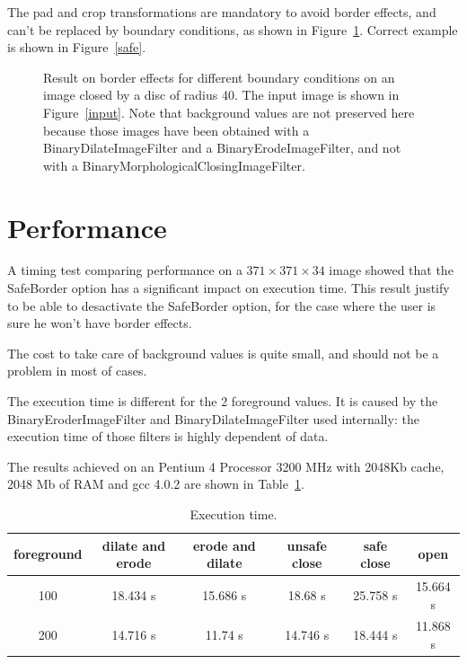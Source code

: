 \documentclass{InsightArticle}
\begin{document}
The pad and crop transformations are mandatory to avoid border effects, and can't
be replaced by boundary conditions, as shown in Figure~\ref{boundary}.
Correct example is shown in Figure~\ref{safe}.

\begin{figure}[htbp]
\begin{center}
\caption{Result on border effects for different boundary conditions on an image
closed by a disc of radius 40. The input image is shown in Figure~\ref{input}.
Note that 
background values are not preserved here because those images have been obtained
with a BinaryDilateImageFilter and a BinaryErodeImageFilter, and not with a
BinaryMorphologicalClosingImageFilter.\label{boundary}}
\end{center}
\end{figure}


\section{Performance}
A timing test comparing performance on a $371 \times 371 \times 34$
image showed that the SafeBorder option has a significant impact on execution
time. This result justify to be able to desactivate the SafeBorder
option, for the case where the user is sure he won't have border
effects.

The cost to take care of background values is quite small, and should
not be a problem in most of cases.

The execution time is different for the 2 foreground values. It is caused by
the BinaryEroderImageFilter and BinaryDilateImageFilter used internally:
the execution time of those filters is highly dependent of data.

The results achieved on an Pentium 4
Processor 3200 MHz with 2048Kb cache, 2048 Mb of RAM and gcc
4.0.2 are shown in Table~\ref{perf}.

\begin{table}[htbp]
\centering
\begin{tabular}{cccccc}
\hline
foreground & dilate and erode & erode and dilate & unsafe close & safe close & open  \\
\hline
\hline
100 & 18.434 s & 15.686 s & 18.68 s  & 25.758 s & 15.664 s \\
200 & 14.716 s & 11.74 s  & 14.746 s & 18.444 s & 11.868 s \\
\hline
\end{tabular}
\caption{Execution time.\label{perf}}
\end{table}
\end{document}
